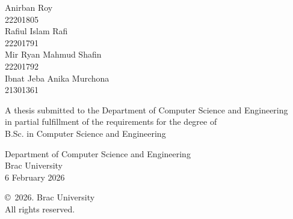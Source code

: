 \begin{titlepage}
\renewcommand*{\thepage}{Title} %

    \begin{center} 
        \vspace*{3cm} %
        
        {\fontsize{16pt}{22pt}\selectfont{Synthetic Data Generation of Adverse Driving Conditions
for Autonomous Driving Pretraining}
        } %
        
        \vspace{1.5cm}
        
        
        \vspace{0.5cm}
        
        	Anirban Roy\\
	        22201805\\
	        Rafiul Islam Rafi\\
	        22201791\\
	        Mir Ryan Mahmud Shafin\\
	        22201792\\
	        Ibnat Jeba Anika Murchona\\
	        21301361

        \vspace{1.5cm}
        
        	A thesis submitted to the Department of Computer Science and Engineering\\
            in partial fulfillment of the requirements for the degree of\\
            B.Sc. in Computer Science and Engineering

        
        \vspace{2.5cm}
        
    		Department of Computer Science and Engineering\\
            Brac University\\
            6 February 2026
        
        \vspace{3cm}
        
    		\copyright\ 2026. Brac University\\
            All rights reserved.
    
    \end{center}

\end{titlepage}